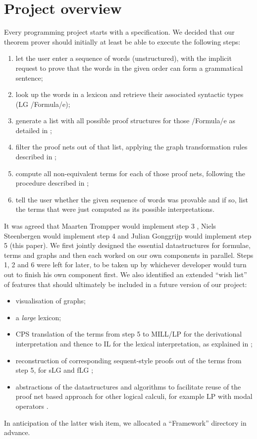 \documentclass[12pt,a4paper]{article}
\begin{document}
\section{Project overview}\label{sec:project}

Every programming project starts with a specification. We decided that our theorem prover should initially at least be able to execute the following steps:
\begin{enumerate}
    \item let the user enter a sequence of words (unstructured), with the implicit request to prove that the words in the given order can form a grammatical sentence;
    \item look up the words in a lexicon and retrieve their associated syntactic types (LG \hs/Formula/e);
    \item generate a list with all possible proof structures for those \hs/Formula/e as detailed in \cite[p.~4--7]{mm12};
    \item filter the proof nets out of that list, applying the graph transformation rules described in \cite[p.~7--11]{mm12};
    \item compute all non-equivalent terms for each of those proof nets, following the procedure described in \cite[p.~21--26]{mm12};
    \item tell the user whether the given sequence of words was provable and if so, list the terms that were just computed as its possible interpretations.
\end{enumerate}
It was agreed that Maarten Trompper would implement step 3 \cite{maarten}, Niels Steenbergen would implement step 4 \cite{niels} and Julian Gonggrijp would implement step 5 (this paper). We first jointly designed the essential datastructures for formulae, terms and graphs and then each worked on our own components in parallel. Steps 1, 2 and 6 were left for later, to be taken up by whichever developer would turn out to finish his own component first. We also identified an extended ``wish list'' of features that should ultimately be included in a future version of our project:
\begin{itemize}
    \item visualisation of graphs;
    \item a \emph{large} lexicon;
    \item CPS translation of the terms from step 5 to MILL/LP for the derivational interpretation and thence to IL for the lexical interpretation, as explained in \cite[p.~14,19--21]{mm12};
    \item reconstruction of corresponding sequent-style proofs out of the terms from step 5, for sLG \cite[p.~3--4]{mm12} and fLG \cite[p.~15--18]{mm12};
    \item abstractions of the datastructures and algorithms to facilitate reuse of the proof net based approach for other logical calculi, for example LP with modal operators \cite{qm02}.
\end{itemize}
In anticipation of the latter wish item, we allocated a ``Framework'' directory in advance.
\end{document}

